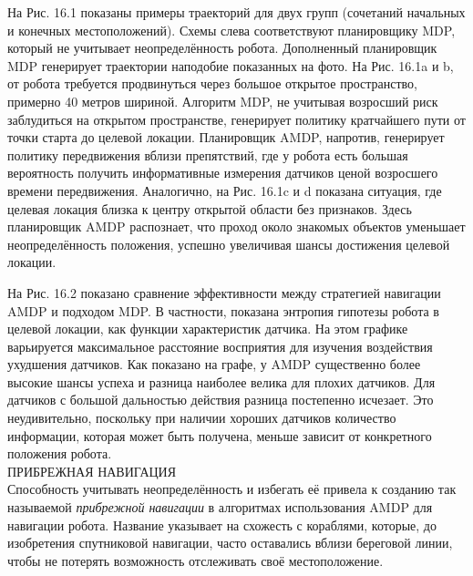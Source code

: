 \documentclass[10pt,a4paper]{article}
\begin{document}
На Рис. 16.1 показаны примеры траекторий для двух групп (сочетаний начальных и конечных местоположений). Схемы слева соответствуют планировщику MDP, который не учитывает неопределённость робота. Дополненный планировщик MDP генерирует траектории наподобие показанных на фото. На Рис. 16.1a и b, от робота требуется продвинуться через большое открытое пространство, примерно 40 метров шириной. Алгоритм MDP, не учитывая возросший риск заблудиться на открытом пространстве, генерирует политику кратчайшего пути от точки старта до целевой локации. Планировщик AMDP, напротив, генерирует политику передвижения вблизи препятствий, где у робота есть большая вероятность получить информативные измерения датчиков ценой возросшего времени передвижения. Аналогично, на Рис. 16.1c и d показана ситуация, где целевая локация близка к центру открытой области без признаков. Здесь планировщик AMDP распознает, что проход около знакомых объектов уменьшает неопределённость положения, успешно увеличивая шансы достижения целевой локации.

На Рис. 16.2 показано сравнение эффективности между стратегией навигации AMDP и подходом MDP. В частности, показана энтропия гипотезы робота в целевой локации, как функции характеристик датчика. На этом графике варьируется максимальное расстояние восприятия для изучения воздействия ухудшения датчиков. Как показано на графе, у AMDP существенно более высокие шансы успеха и разница наиболее велика для плохих датчиков. Для датчиков с большой дальностью действия разница постепенно исчезает. Это неудивительно, поскольку при наличии хороших датчиков количество информации, которая может быть получена, меньше зависит от конкретного положения робота.\\

ПРИБРЕЖНАЯ НАВИГАЦИЯ\\

Способность учитывать неопределённость и избегать её привела к созданию так называемой \textit{прибрежной навигации} в алгоритмах использования AMDP для навигации робота. Название указывает на схожесть с кораблями, которые, до изобретения спутниковой навигации, часто оставались вблизи береговой линии, чтобы не потерять возможность отслеживать своё местоположение.
\end{document}
